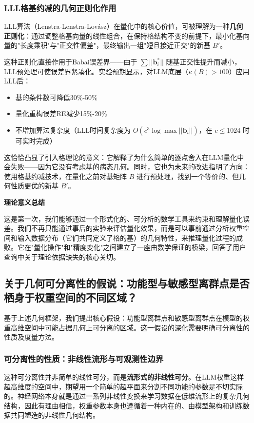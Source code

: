 \documentclass[letterpaper,twocolumn,10pt]{article}
\begin{document}
\subsubsection{LLL格基约减的几何正则化作用}

LLL算法（Lenstra-Lenstra-Lovász）在量化中的核心价值，可被理解为一种\textbf{几何正则化}：通过调整格基向量的线性组合，在保持格结构不变的前提下，最小化基向量的"长度乘积"与"正交性偏差"，最终输出一组"短且接近正交"的新基 $B'$。

这种正则化直接作用于Babai误差界——由于 $\sum ||\mathbf{b}_i^*||$ 随基正交性提升而减小，LLL预处理可使误差界紧凑化。实验预期显示，对LLM底层（$\kappa(B) > 100$）应用LLL后：
\begin{itemize}
\item 基的条件数可降低30\%-50\%
\item 量化重构误差RE减少15\%-20\%
\item 不增加算法复杂度（LLL时间复杂度为 $O(c^3 \log \max ||\mathbf{b}_i||)$，在 $c \leq 1024$ 时可实时完成）
\end{itemize}

这恰恰凸显了引入格理论的意义：它解释了为什么简单的逐点舍入在LLM量化中会失败——因为它没有考虑基的病态几何。同时，它也为未来的改进指明了方向：使用格基约减技术，在量化之前对基矩阵 $B$ 进行预处理，找到一个等价的、但几何性质更优的新基 $B'$。

\textbf{理论意义总结}

这是第一次，我们能够通过一个形式化的、可分析的数学工具来约束和理解量化误差。我们不再只能通过事后的实验来评估量化效果，而是可以事前通过分析权重空间和输入数据分布（它们共同定义了格的基）的几何特性，来推理量化过程的成败。它在"量化操作"和"精度变化"之间建立了一座由数学保证的桥梁，回答了用户查询中关于理论依据缺失的核心关切。

\subsection{关于几何可分离性的假说：功能型与敏感型离群点是否栖身于权重空间的不同区域？}

基于上述几何框架，我们提出核心假设：功能型离群点和敏感型离群点在模型的权重高维空间中可能占据几何上可分离的区域。这一假设的深化需要明确可分离性的性质及度量方法。

\subsubsection{可分离性的性质：非线性流形与可观测性边界}

这种可分离性并非简单的线性可分，而是\textbf{流形式的非线性可分}。在LLM权重这样超高维度的空间中，期望用一个简单的超平面来分割不同功能的参数是不切实际的。神经网络本身就是通过一系列非线性变换来学习数据在低维流形上的复杂几何结构，因此有理由相信，权重参数本身也遵循着一种内在的、由模型架构和训练数据共同塑造的非线性几何结构。
\end{document}
